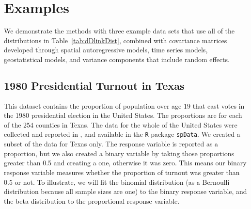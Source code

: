 \documentclass[12pt, titlepage]{article}
\begin{document}

\section{Examples}

We demonstrate the methods with three example data sets that use all of the distributions in Table~\ref{tab:dDlinkDist}, combined with covariance matrices developed through spatial autoregressive models, time series models, geostatistical models, and variance components that include random effects.


\subsection{1980 Presidential Turnout in Texas}

This dataset contains the proportion of population over age 19 that cast votes in the 1980 presidential election in the United States.  The proportions are for each of the 254 counties in Texas.  The data for the whole of the United States were collected and reported in \citet{pace_quick_1997}, and available in the \texttt{R} package \texttt{spData}.  We created a subset of the data for Texas only.  The response variable is reported as a proportion, but we also created a binary variable by taking those proportions greater than 0.5 and creating a one, otherwise it was zero. This means our binary response variable measures whether the proportion of turnout was greater than 0.5 or not. To illustrate, we will fit the binomial distribution (as a Bernoulli distribution because all sample sizes are one) to the binary response variable, and the beta distribution to the proportional response variable.
\end{document}
